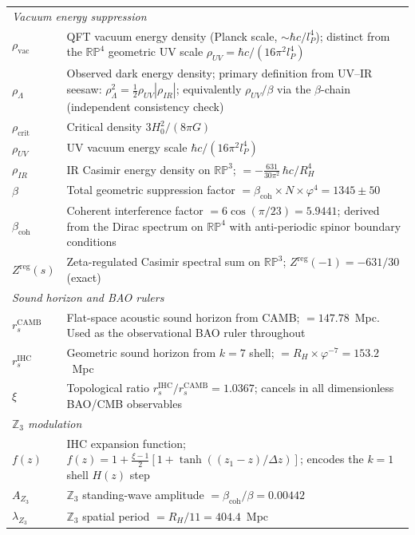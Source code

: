 \documentclass[12pt,a4paper]{article}
\begin{document}
\begin{longtable}{p{2.8cm} p{9.5cm}}
\multicolumn{2}{l}{\textit{Vacuum energy suppression}} \\[2pt]
$\rho_\mathrm{vac}$ & QFT vacuum energy density (Planck scale, $\sim\hbar c/l_P^4$); distinct from the $\mathbb{RP}^4$ geometric UV scale $\rho_{UV} = \hbar c/(16\pi^2 l_P^4)$ \\
$\rho_\Lambda$ & Observed dark energy density; primary definition from UV--IR seesaw: $\rho_\Lambda^2 = \tfrac{1}{2}\rho_{UV}|\rho_{IR}|$; equivalently $\rho_{UV}/\beta$ via the $\beta$-chain (independent consistency check) \\
$\rho_\mathrm{crit}$ & Critical density $3H_0^2/(8\pi G)$ \\
$\rho_{UV}$ & UV vacuum energy scale $\hbar c/(16\pi^2 l_P^4)$ \\
$\rho_{IR}$ & IR Casimir energy density on $\mathbb{RP}^3$; $= -\tfrac{631}{30\pi^2}\,\hbar c/R_H^4$ \\
$\beta$ & Total geometric suppression factor $= \beta_\mathrm{coh} \times N \times \varphi^4 = 1345 \pm 50$ \\
$\beta_\mathrm{coh}$ & Coherent interference factor $= 6\cos(\pi/23) = 5.9441$; derived from
  the Dirac spectrum on $\mathbb{RP}^4$ with anti-periodic spinor boundary conditions \\
$Z^\mathrm{reg}(s)$ & Zeta-regulated Casimir spectral sum on $\mathbb{RP}^3$; $Z^\mathrm{reg}(-1) = -631/30$ (exact) \\[6pt]

\multicolumn{2}{l}{\textit{Sound horizon and BAO rulers}} \\[2pt]
$r_s^\mathrm{CAMB}$ & Flat-space acoustic sound horizon from CAMB; $= 147.78$~Mpc. Used as the observational BAO ruler throughout \\
$r_s^\mathrm{IHC}$ & Geometric sound horizon from $k=7$ shell; $= R_H \times \varphi^{-7} = 153.2$~Mpc \\
$\xi$ & Topological ratio $r_s^\mathrm{IHC}/r_s^\mathrm{CAMB} = 1.0367$; cancels in all dimensionless BAO/CMB observables \\[6pt]

\multicolumn{2}{l}{\textit{$\mathbb{Z}_3$ modulation}} \\[2pt]
$f(z)$ & IHC expansion function; $f(z) = 1 + \frac{\xi-1}{2}[1 + \tanh((z_1-z)/\Delta z)]$; encodes the $k=1$ shell $H(z)$ step \\
$A_{Z_3}$ & $\mathbb{Z}_3$ standing-wave amplitude $= \beta_\mathrm{coh}/\beta = 0.00442$ \\
$\lambda_{Z_3}$ & $\mathbb{Z}_3$ spatial period $= R_H/11 = 404.4$~Mpc \\[6pt]


\end{longtable}
\end{document}
